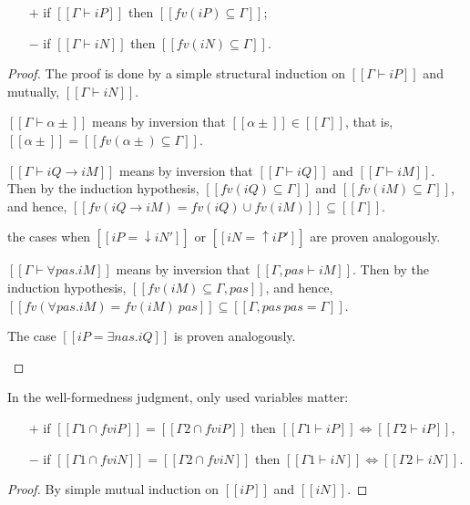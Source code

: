 \begin{lemma}
    \label{lemma:wf-soundness}
    \hfill

  \begin{itemize}
    \item[$+$] if $[[Γ ⊢ iP]]$ then $[[fv(iP) ⊆ {Γ}]]$;
    \item[$-$] if $[[Γ ⊢ iN]]$ then $[[fv(iN) ⊆ {Γ}]]$.
  \end{itemize}
\end{lemma}
\begin{proof}
  The proof is done by a simple structural induction on 
  $[[Γ⊢ iP]]$ and mutually, $[[Γ ⊢ iN]]$.
  \begin{caseof}
    \item $[[Γ ⊢ α±]]$ means by inversion that $[[α±]] \in [[Γ]]$,
      that is, $[[α±]] = [[fv(α±) ⊆ {Γ}]]$.
    \item $[[Γ ⊢ iQ → iM]]$ means by inversion that
      $[[Γ ⊢ iQ]]$ and $[[Γ ⊢ iM]]$.
      Then by the induction hypothesis, $[[fv(iQ) ⊆ {Γ}]]$ and $[[fv(iM) ⊆ {Γ}]]$,
      and hence, $[[fv(iQ → iM) = fv(iQ) ∪ fv(iM)]] \subseteq [[{Γ}]]$.
    \item the cases when $[[iP = ↓iN']]$ or $[[iN = ↑iP']]$ are proven analogously.
    \item $[[Γ ⊢ ∀pas.iM]]$ means by inversion that $[[Γ, pas ⊢ iM]]$.
      Then by the induction hypothesis, $[[fv(iM) ⊆ {Γ, pas}]]$, and hence,
      $[[fv(∀pas.iM) = fv(iM) \ {pas}]] \subseteq [[{Γ, pas} \ {pas} = {Γ}]]$.
    \item The case $[[iP = ∃nas.iQ]]$ is proven analogously.
  \end{caseof}
\end{proof}

\begin{lemma}
  \label{lemma:wf-ctxt-equiv}

  In the well-formedness judgment, only used variables matter:
  \begin{itemize}
  \item[$+$] if $[[{Γ1} ∩ fv iP]] = [[{Γ2} ∩ fv iP]]$ then
    $[[Γ1 ⊢ iP]] \iff [[Γ2 ⊢ iP]]$,
  \item[$-$] if $[[{Γ1} ∩ fv iN]] = [[{Γ2} ∩ fv iN]]$ then
    $[[Γ1 ⊢ iN]] \iff [[Γ2 ⊢ iN]]$.
  \end{itemize}
\end{lemma}
\begin{proof}
  By simple mutual induction on $[[iP]]$ and $[[iN]]$.
\end{proof}

